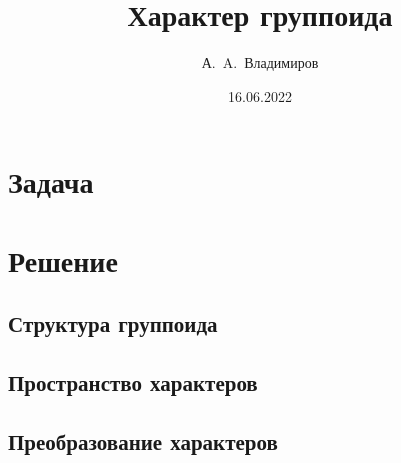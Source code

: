 \documentclass[11pt]{article}
\theoremstyle{plain}
\theoremstyle{definition}
\theoremstyle{remark}
\begin{document}
\author{А.~A.~Владимиров}
\title{Характер группоида}
\date{16.06.2022}
\maketitle

\section*{Задача}


\section*{Решение}
\tableofcontents

\newpage    \subsection{Структура группоида}
            

\newpage    \subsection{Пространство характеров}
            
            
            
            
            

\newpage    \subsection{Преобразование характеров}
            
            
            
\end{document}
